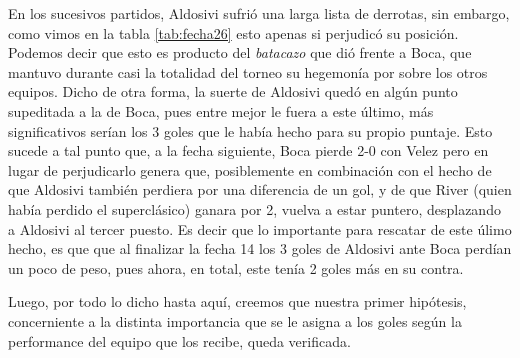 En los sucesivos partidos, Aldosivi sufrió una larga lista de derrotas, sin embargo, como vimos en la tabla \ref{tab:fecha26} esto apenas si perjudicó su posición. Podemos decir que esto es producto del \emph{batacazo} que dió frente a Boca, que mantuvo durante casi la totalidad del torneo su hegemonía por sobre los otros equipos. Dicho de otra forma, la suerte de Aldosivi quedó en algún punto supeditada a la de Boca, pues entre mejor le fuera a este último, más significativos serían los 3 goles que le había hecho para su propio puntaje. Esto sucede a tal punto que, a la fecha siguiente, Boca pierde 2-0 con Velez pero en lugar de perjudicarlo genera que, posiblemente en combinación con el hecho de que Aldosivi también perdiera por una diferencia de un gol, y de que River (quien había perdido el superclásico) ganara por 2, vuelva a estar puntero, desplazando a Aldosivi al tercer puesto. Es decir que lo importante para rescatar de este úlimo hecho, es que que al finalizar la fecha 14 los 3 goles de Aldosivi ante Boca perdían un poco de peso, pues ahora, en total, este tenía 2 goles más en su contra.

Luego, por todo lo dicho hasta aquí, creemos que nuestra primer hipótesis, concerniente a la distinta importancia que se le asigna a los goles según la performance del equipo que los recibe, queda verificada.  


